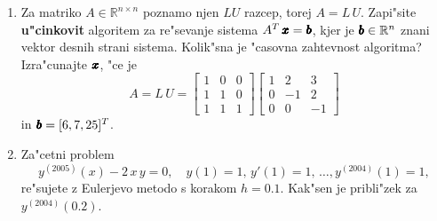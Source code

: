 \documentclass[11pt,a4paper]{article}
\def\RR{\mathbb{R}}
\def\bfm#1{{\dimen0=.01em\dimen1=.009em\makebold{$#1$}}}
\def\makebold#1{\mathord{\setbox0=\hbox{#1}
       \copy0\kern-\wd0
       \raise\dimen1\copy0\kern-\wd0
       {\advance\dimen1 by \dimen1\raise\dimen1\copy0}\kern-\wd0
       \kern\dimen0\raise\dimen1\copy0\kern-\wd0
       {\advance\dimen1 by \dimen1\raise\dimen1\copy0}\kern-\wd0
       \kern\dimen0\raise\dimen1\copy0\kern-\wd0
       {\advance\dimen1 by \dimen1\raise\dimen1\copy0}\kern-\wd0
       \kern\dimen0\raise\dimen1\copy0\kern-\wd0
       \kern\dimen0\box0}}
\begin{document}
\begin{enumerate}
  
  \item Za matriko $A\in\RR^{n\times n}$ poznamo njen $LU$ razcep,
        torej $A=L\,U$. Zapi"site {\bf u"cinkovit} algoritem za
            re"sevanje sistema $A^T\,\bfm{x}=\bfm{b}$, kjer
            je $\bfm{b}\in\RR^n$ znani vektor desnih strani sistema.
            Kolik"sna je "casovna zahtevnost algoritma?
            Izra"cunajte $\bfm{x}$, "ce je
            $$
              A=L\,U=
              \left[
                \begin{array}{ccc}
                  1 & 0 & 0\\
                  1 & 1 & 0\\
                  1 & 1 & 1
                \end{array}
               \right]
               \left[
                \begin{array}{ccc}
                  1 & 2 & 3\\
                  0 & -1 & 2\\
                  0 & 0 & -1
                \end{array}
               \right]
            $$
            in $\bfm{b}=[6,7,25]^T$.
   \item Za"cetni problem 
     $$y^{(2005)}(x)-2\,x\,y=0,\quad y(1)=1,\,y'(1)=1,\,\dots, y^{(2004)}(1)=1,
     $$
     re"sujete z Eulerjevo metodo s korakom $h=0.1$. Kak"sen je pribli"zek
     za $y^{(2004)}(0.2)$.

\end{enumerate}
\end{document}
